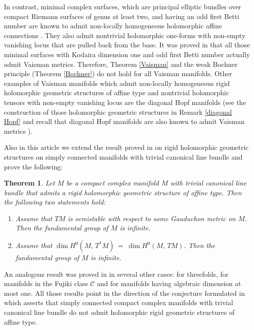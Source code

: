 \documentclass[12pt,reqno]{amsart}
\newtheorem{theorem}{Theorem}[section]
\theoremstyle{definition}
\numberwithin{equation}{section}
\begin{document}
In contrast, minimal complex surfaces, which are principal elliptic bundles over compact Riemann surfaces of 
genus at least two, and having an odd first Betti number are known to admit non-locally homogeneous 
holomorphic affine connections \cite{Du1}. They also admit nontrivial holomorphic one-forms with non-empty 
vanishing locus that are pulled back from the base. It was proved in \cite{Bel} that all those minimal 
surfaces with Kodaira dimension one and odd first Betti number actually admit Vaisman metrics. Therefore, 
Theorem \ref{Vaisman} and the weak Bochner principle (Theorem \ref{Bochner}) do not hold for all Vaisman 
manifolds. Other examples of Vaisman manifolds which admit non-locally homogeneous rigid holomorphic 
geometric structures of affine type and nontrivial holomorphic tensors with non-empty vanishing locus are 
the diagonal Hopf manifolds (see the construction of those holomorphic geometric structures in Remark 
\ref{diagonal Hopf} and recall that diagonal Hopf manifolds are also known to admit Vaisman metrics 
\cite{Bel}).

Also in this article we extend the result proved in \cite[Theorem D]{BCDG} on rigid holomorphic 
geometric structures on simply connected manifolds with trivial canonical line bundle and prove the 
following:

\begin{theorem}\label{main} Let $M$ be a compact complex manifold $M$ with trivial canonical line bundle 
that admits a rigid holomorphic geometric structure of affine type. Then the following two statements hold: 
\begin{enumerate}

\item Assume that $TM$ is semistable with respect to some Gauduchon metric on $M$. Then the fundamental 
group of $M$ is infinite.

\item Assume that $\dim H^0(M,\, T^*M) \ =\ \dim H^0(M,\, TM)$. Then the fundamental group of $M$ is infinite.
\end{enumerate}
\end{theorem}

An analogous result was proved in \cite[Theorem D]{BCDG} in several other cases: for threefolds, for 
manifolds in the Fujiki class $\mathcal C$ and for manifolds having algebraic dimension at most one. All 
those results point in the direction of the conjecture formulated in \cite{BCDG} which asserts that simply 
connected compact complex manifolds with trivial canonical line bundle do not admit holomorphic rigid 
geometric structures of affine type.
\end{document}
